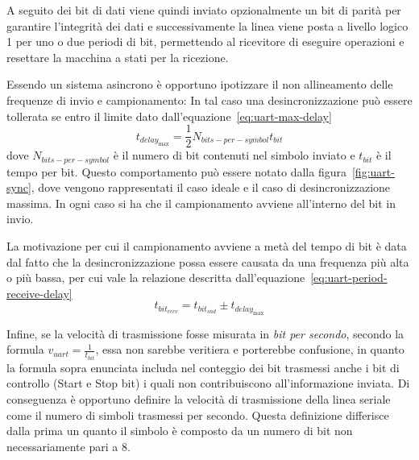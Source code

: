 A seguito dei bit di dati viene quindi inviato opzionalmente un bit di parità per garantire l'integrità dei dati e successivamente la linea viene posta a livello logico 1 per uno o due periodi di bit, permettendo al ricevitore di eseguire operazioni e resettare la macchina a stati per la ricezione.\cite{site:rs-uart}

Essendo un sistema asincrono è opportuno ipotizzare il non allineamento delle frequenze di invio e campionamento: In tal caso una desincronizzazione può essere tollerata se entro il limite dato dall'equazione~\ref{eq:uart-max-delay}
\begin{equation}\label{eq:uart-max-delay}
    t_{delay_{\max}} = \frac{1}{2}N_{bits-per-symbol}t_{bit}    
\end{equation}
dove \(N_{bits-per-symbol}\) è il numero di bit contenuti nel simbolo inviato e \(t_{bit}\) è il tempo per bit. Questo comportamento può essere notato dalla figura~\ref{fig:uart-sync}, dove vengono rappresentati il caso ideale e il caso di desincronizzazione massima. In ogni caso si ha che il campionamento avviene all'interno del bit in invio.


La motivazione per cui il campionamento avviene a metà del tempo di bit è data dal fatto che la desincronizzazione possa essere causata da una frequenza più alta o più bassa, per cui vale la relazione descritta dall'equazione~\ref{eq:uart-period-receive-delay}
\begin{equation}\label{eq:uart-period-receive-delay}
     t_{bit_{recv}} = t_{bit_{snd}} \pm t_{delay_{\max}}
\end{equation}

Infine, se la velocità di trasmissione fosse misurata in \textit{bit per secondo}, secondo la formula \(v_{uart} = \frac{1}{t_{bit}}\), essa non sarebbe veritiera e porterebbe confusione, in quanto la formula sopra enunciata includa nel conteggio dei bit trasmessi anche i bit di controllo (Start e Stop bit) i quali non contribuiscono all'informazione inviata. Di conseguenza è opportuno definire la velocità di trasmissione della linea seriale come il numero di simboli trasmessi per secondo. Questa definizione differisce dalla prima un quanto il simbolo è composto da un numero di bit non necessariamente pari a 8.

